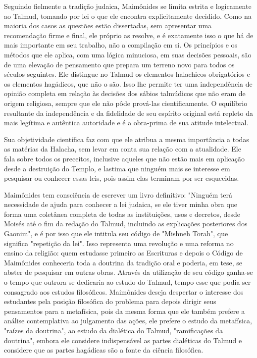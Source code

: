 \begin{itemize}
\begin{enumrate}
Seguindo fielmente a tradição judaica, Maimônides se limita estrita e
logicamente ao Talmud, tomando por lei o que ele encontra explicitamente
decidido. Como na maioria dos casos as questões estão dissertadas, sem
apre­sentar uma recomendação firme e final, ele próprio as resolve, e é
exatamente isso o que há de mais importante em seu trabalho, não a
compilação em si. Os princípios e os métodos que ele aplica, com uma
lógica minuciosa, em suas de­cisões pessoais, são de uma elevação de
pensamento que prepara um terreno novo para todos os séculos seguintes.
Ele distingue no Talmud os elementos halachicos obrigatórios e os
elementos hagádicos, que não o são. Isso lhe per­mite ter uma
independência de opinião completa em relação às decisões dos sábios
talmúdicos que não eram de origem religiosa, sempre que ele não pôde
prová-las cientificamente. O equilíbrio resultante da independência e da
fideli­dade de seu espírito original está repleto da mais legítima e
autêntica autorida­de e é a obra-prima de sua atitude intelectual.

Sua objetividade científica faz com que ele atribua a mesma impor­tância
a todas as matérias da Halacha, sem levar em conta sua relação com a
atualidade. Ele fala sobre todos os preceitos, inclusive aqueles que não
estão mais em aplicação desde a destruição do Templo, e lastima que
ninguém mais se interesse em pesquisar ou conhecer essas leis, pois
assim elas terminam por ser esquecidas.

Maimônides tem consciência de escrever um livro definitivo: "Nin­guém
terá necessidade de ajuda para conhecer a lei judaica, se ele tiver
minha obra que forma uma coletânea completa de todas as instituições,
usos e decre­tos, desde Moisés até o fim da redação do Talmud, incluindo
as explicações posteriores dos Gaonim", e é por isso que ele intitula
seu código de "Mishneh Torah", que significa "repetição da lei". Isso
representa uma revolução e uma reforma no ensino da religião: quem
estudasse primeiro as Escrituras e depois o Código de Maimônides
conheceria toda a doutrina da tradição oral e poderia, em tese, se
abster de pesquisar em outras obras. Através da utilização de seu código
ganha-se o tempo que outrora se dedicaria ao estudo do Talmud, tem­po
esse que podia ser consagrado aos estudos filosóficos. Maimônides deseja
despertar o interesse dos estudantes pela posição filosófica do problema
para depois dirigir seus pensamentos para a metafísica, pois da mesma
forma que ele também prefere a análise contemplativa ao julgamento das
ações, ele prefe­re o estudo da metafísica, "raízes da doutrina", ao
estudo da dialética do Tal­mud, "ramificações da doutrina", embora ele
considere indispensável as par­tes dialéticas do Talmud e considere que
as partes hagádicas são a fonte da ciência filosófica.


\end{enumrate}
\end{itemize}
